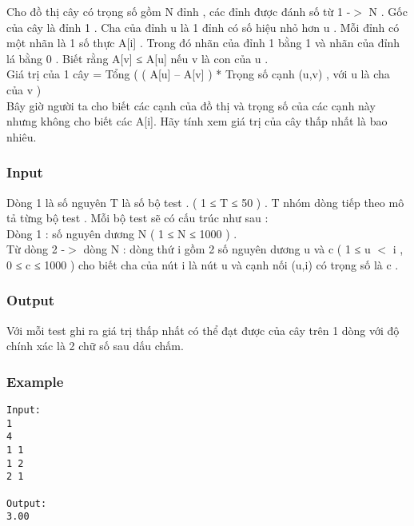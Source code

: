 



   Cho đồ thị cây có trọng số gồm N đỉnh , các đỉnh được đánh số từ 1 -$>$ N . Gốc của cây là đỉnh 1 . Cha của đỉnh u là 1 đỉnh có số hiệu nhỏ hơn u . Mỗi đỉnh có một nhãn là 1 số thực A[i] . Trong đó nhãn của đỉnh 1 bằng 1 và nhãn của đỉnh lá bằng 0 . Biết rằng A[v] ≤ A[u] nếu v là con của u .   
\\   Giá trị của 1 cây = Tổng (  ( A[u] – A[v] ) * Trọng số cạnh (u,v)  , với u là cha của v )   
\\   Bây giờ người ta cho biết các cạnh của đồ thị và trọng số của các cạnh này nhưng không cho biết các A[i]. Hãy tính xem giá trị của cây thấp nhất là bao nhiêu.  

\subsubsection{   Input  }

   Dòng 1 là số nguyên T là số bộ test . (  1 ≤ T ≤ 50 ) . T nhóm dòng tiếp theo mô tả từng bộ test . Mỗi bộ test sẽ có cấu trúc như sau :   
\\   Dòng 1 : số nguyên dương N ( 1 ≤ N ≤ 1000 ) .   
\\   Từ dòng 2 -$>$ dòng N : dòng thứ i gồm 2 số nguyên dương u và c ( 1 ≤ u $<$ i , 0 ≤ c ≤ 1000 ) cho biết cha của nút i là nút u và cạnh nối (u,i) có trọng số là c .  

\subsubsection{   Output  }

   Với mỗi test ghi ra giá trị thấp nhất có thể đạt được của cây trên 1 dòng với độ chính xác là 2 chữ số sau dấu chấm.  

\subsubsection{   Example  }
\begin{verbatim}
Input:
1
4
1 1
1 2
2 1

Output:
3.00
\end{verbatim}